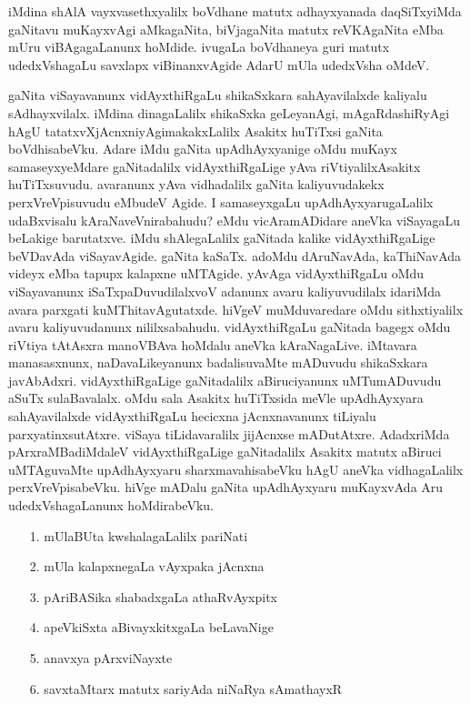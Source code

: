 iMdina shAlA vayxvasethxyalilx boVdhane matutx adhayxyanada daqSiTxyiMda gaNitavu muKayxvAgi aMkagaNita, biVjagaNita matutx reVKAgaNita eMba mUru viBAgagaLanunx hoMdide. ivugaLa boVdhaneya guri matutx udedxVshagaLu savxlapx viBinanxvAgide AdarU mUla udedxVsha oMdeV.

gaNita viSayavanunx vidAyxthiRgaLu shikaSxkara sahAyavilalxde kaliyalu sAdhayxvilalx. iMdina dinagaLalilx shikaSxka geLeyanAgi, mAgaRdashiRyAgi hAgU tatatxvXjAcnxniyAgi\break makakxLalilx Asakitx huTiTxsi gaNita boVdhisabeVku. Adare iMdu gaNita upAdhAyxyanige oMdu muKayx samaseyxyeMdare gaNitadalilx vidAyxthiRgaLige yAva riVtiyalilx\break Asakitx huTiTxsuvudu. avaranunx yAva vidhadalilx gaNita kaliyuvudakekx perxVreVpisuvudu eMbudeV Agide. I samaseyxgaLu upAdhAyxyarugaLalilx udaBxvisalu kAraNaveVnira\-bahudu? eMdu vicAramADidare aneVka viSayagaLu beLakige barutatxve. iMdu shAlegaLalilx gaNitada kalike vidAyxthiRgaLige beVDavAda viSayavAgide. gaNita kaSaTx. adoMdu dAruNavAda, kaThiNavAda videyx eMba tapupx kalapxne uMTAgide. yAvAga vidAyxthiRgaLu oMdu viSayavanunx iSaTxpaDuvudilalxvoV adanunx avaru kaliyuvudilalx idariMda avara parxgati kuMThitavAgutatxde. hiVgeV muMduvaredare oMdu sithxtiyalilx avaru kaliyuvudanunx nililxsabahudu. vidAyxthiRgaLu gaNitada bagegx oMdu riVtiya tAtAsxra manoVBAva hoMdalu aneVka kAraNagaLive. iMtavara manasasxnunx, naDavaLikeyanunx badalisuvaMte mADuvudu shikaSxkara javAbAdxri. vidAyxthiRgaLige gaNitadalilx aBiruciyanunx uMTumADuvudu aSuTx sulaBavalalx. oMdu sala Asakitx huTiTxsida meVle upAdhAyxyara sahAyavilalxde vidAyxthiRgaLu hecicxna jAcnxnavanunx tiLiyalu parxyatinxsutAtxre. viSaya tiLidavaralilx jijAcnxse mADutAtxre. AdadxriMda pArxraMBadiMdaleV vidAyxthiRgaLige gaNitadalilx Asakitx matutx aBiruci uMTAguvaMte upAdhAyxyaru sharxmavahisabeVku hAgU aneVka vidhagaLalilx perxVreVpisabeVku. hiVge mADalu gaNita upAdhAyxyaru muKayxvAda Aru udedxVshagaLanunx hoMdirabeVku.
\begin{enumerate}
\item[{\rm 1.}] mUlaBUta kwshalagaLalilx pariNati
\item[{\rm 2.}] mUla kalapxnegaLa vAyxpaka jAcnxna
\item[{\rm 3.}] pAriBASika shabadxgaLa athaRvAyxpitx
\item[{\rm 4.}] apeVkiSxta aBivayxkitxgaLa beLavaNige
\item[{\rm 5.}] anavxya pArxviNayxte
\item[{\rm 6.}] savxtaMtarx matutx sariyAda niNaRya sAmathayxR
\end{enumerate}

